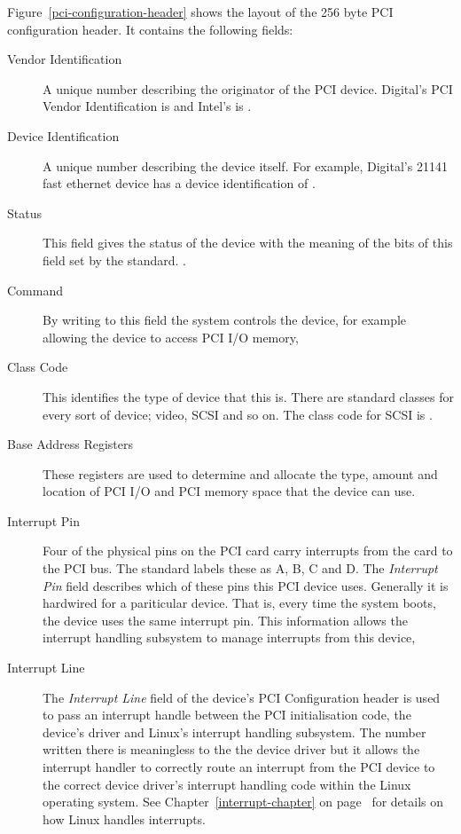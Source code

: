Figure~\ref{pci-configuration-header} shows the layout
of the 256 byte PCI configuration header.  
It contains the following fields:
\begin{description}
	\item [Vendor Identification] A unique number 
	describing the originator
	of the PCI device.  Digital's PCI Vendor Identification is
	 and Intel's is .
	\item [Device Identification] A unique number describing
	the device itself.  For example, Digital's 21141 fast
	ethernet device has a device identification of .
	\item [Status] This field gives the status of the
	device with the meaning of the bits of this field set	
	by the standard. \cite[PCI Local Bus Specification]{bib-pci-specification}.
	\item [Command] By writing to this field the system
	controls the device, for example allowing the device to access PCI I/O memory,
	\item [Class Code] This identifies the type of device that
	this is.  There are standard classes for every sort of device;
	video, SCSI and so on.  The class code for SCSI is .
	\item [Base Address Registers] These registers are used to
	determine and allocate the type, amount and location of
	PCI I/O and PCI memory space that the device can use.
	\item [Interrupt Pin] Four of the physical pins on the PCI card carry
		interrupts from the card to the PCI bus.  The standard labels these as
		A, B, C and D.   The {\em Interrupt Pin} field describes which of these 
		pins this PCI device uses.  Generally it is hardwired for a pariticular
		device.  That is, every time the system boots, the device uses the same
		interrupt pin.  This information allows the interrupt handling subsystem
		to manage interrupts from this device,
	\item [Interrupt Line] 
		The {\em Interrupt Line} field of the device's PCI Configuration header
		is used to pass an interrupt handle between the PCI initialisation code, 
		the device's driver and Linux's interrupt handling subsystem.
		The number written there is meaningless to the the device driver but it
		allows the interrupt handler to correctly route an interrupt from the
		PCI device to the correct device driver's interrupt handling code within
		the Linux operating system.
		See Chapter~\ref{interrupt-chapter} on page~\pageref{interrupt-chapter}
		for details on how Linux handles interrupts.
\end{description}

